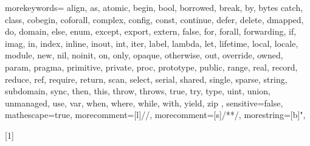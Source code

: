   {
    morekeywords={
      align, as, atomic,
      begin, bool, borrowed, break, by, bytes
      catch, class, cobegin, coforall, complex, config, const, continue,
      defer, delete, dmapped, do, domain,
      else, enum, except, export, extern,
      false, for, forall, forwarding,
      if, imag, in, index, inline, inout, int, iter,
      label, lambda, let, lifetime, local, locale,
      module,
      new, nil, noinit,
      on, only, opaque, otherwise, out, override, owned,
      param, pragma, primitive, private, proc, prototype, public,
      range, real, record, reduce, ref, require, return,
      scan, select, serial, shared, single, sparse, string, subdomain, sync,
      then, this, throw, throws, true, try, type,
      uint, union, unmanaged, use,
      var,
      when, where, while, with,
      yield,
      zip
    },
    sensitive=false,
    mathescape=true,
    morecomment=[l]{//},
    morecomment=[s]{/*}{*/},
    morestring=[b]",
}


\newcommand{\chpl}[1]{\lstinline[language=chapel,basicstyle=\small\ttfamily,keywordstyle=]!#1!}
\newcommand{\varname}[1]{\emph{#1}}
\newcommand{\typename}[1]{\emph{#1}}
\newcommand{\fnname}[1]{\chpl{#1}}




[1]
  {\lstset{language=chapel,xleftmargin=2pc,stepnumber=0,keywordstyle=}}{}



\newenvironment{protobody}{\begin{description}\item[\quad\quad] }{\end{description}}
